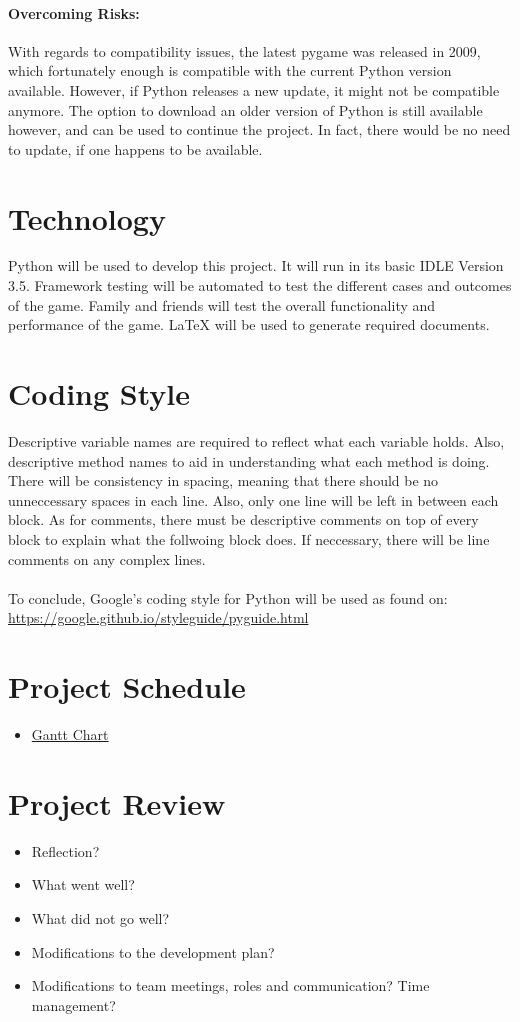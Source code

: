 \documentclass{article}
\begin{document}
\paragraph{Overcoming Risks:}
With regards to compatibility issues, the latest pygame was released in 2009, which fortunately enough is compatible with the current Python version available. However, if Python releases a new update, it might not be compatible anymore. The option to download an older version of Python is still available however, and can be used to continue the project. In fact, there would be no need to update, if one happens to be available.

\section{Technology}
Python will be used to develop this project. It will run in its basic IDLE Version 3.5. Framework testing will be automated to test the different cases and outcomes of the game. Family and friends will test the overall functionality and performance of the game. LaTeX will be used to generate required documents.

\section{Coding Style}
Descriptive variable names are required to reflect what each variable holds. Also, descriptive method names to aid in understanding what each method is doing. There will be consistency in spacing, meaning that there should be no unneccessary spaces in each line. Also, only one line will be left in between each block. As for comments, there must be descriptive comments on top of every block to explain what the follwoing block does. If neccessary, there will be line comments on any complex lines.\\
\\
To conclude, Google's coding style for Python will be used as found on: \url{https://google.github.io/styleguide/pyguide.html}

\section{Project Schedule}

\begin{itemize}

\item \href{run:GanttChart.gan} {Gantt Chart}

\end{itemize}
\section{Project Review}
\begin{itemize}
\item Reflection?
\item What went well?
\item  What did not go well?
\item Modifications to the development plan?
\item Modifications to team meetings, roles and communication? Time management?
\end{itemize}
\end{document}
